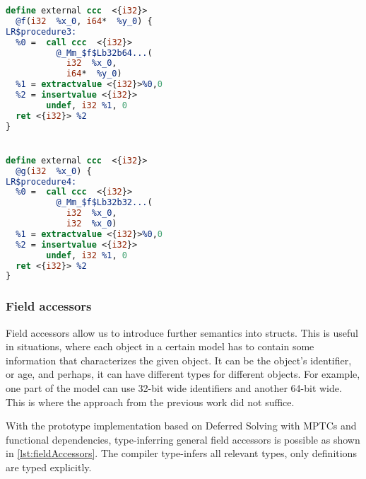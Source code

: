 \begin{listing}
\begin{center}
\begin{minipage}{0.5\linewidth}
\begin{lstlisting}[language=LLVM]
define external ccc  <{i32}>
  @f(i32  %x_0, i64*  %y_0) {
LR$procedure3:
  %0 =  call ccc  <{i32}>
          @_Mm_$f$Lb32b64...(
            i32  %x_0,
            i64*  %y_0)
  %1 = extractvalue <{i32}>%0,0
  %2 = insertvalue <{i32}>
        undef, i32 %1, 0
  ret <{i32}> %2
}


define external ccc  <{i32}>
  @g(i32  %x_0) {
LR$procedure4:
  %0 =  call ccc  <{i32}>
          @_Mm_$f$Lb32b32...(
            i32  %x_0,
            i32  %x_0)
  %1 = extractvalue <{i32}>%0,0
  %2 = insertvalue <{i32}>
        undef, i32 %1, 0
  ret <{i32}> %2
}
    \end{lstlisting}
    \end{minipage}
    \end{center}
\end{listing}
\subsubsection{Field accessors}

Field accessors allow us to introduce further semantics into structs. This is useful in situations, where each object in a certain model has to contain some information that characterizes the given object. It can be the object's identifier, or age, and perhaps, it can have different types for different objects. For example, one part of the model can use 32-bit wide identifiers and another 64-bit wide. This is where the approach from the previous work did not suffice.

With the prototype implementation based on Deferred Solving with MPTCs and functional dependencies, type-inferring general field accessors is possible as shown in \cref{lst:fieldAccessors}. The compiler type-infers all relevant types, only  definitions are typed explicitly.


